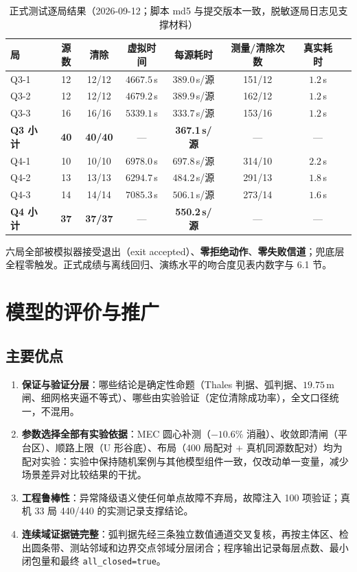 \documentclass[12pt,a4paper]{ctexart}
\begin{document}
\begin{table}[H]
  \centering
  \caption{正式测试逐局结果（2026-09-12；脚本 md5 与提交版本一致，脱敏逐局日志见支撑材料）}
  \label{tab:formal}
  \begin{tabular}{lccccccc}
    \toprule
    局 & 源数 & 清除 & 虚拟时间 & 每源耗时 & 测量/清除次数 & 真实耗时 \\
    \midrule
    Q3-1 & 12 & 12/12 & $4667.5\,$s & $389.0\,$s/源 & 151/12 & $1.2\,$s \\
    Q3-2 & 12 & 12/12 & $4679.2\,$s & $389.9\,$s/源 & 162/12 & $1.2\,$s \\
    Q3-3 & 16 & 16/16 & $5339.1\,$s & $333.7\,$s/源 & 153/16 & $1.2\,$s \\
    \midrule
    \textbf{Q3 小计} & \textbf{40} & \textbf{40/40} & --- & \textbf{367.1\,s/源} & --- & --- \\
    \midrule
    Q4-1 & 10 & 10/10 & $6978.0\,$s & $697.8\,$s/源 & 314/10 & $2.2\,$s \\
    Q4-2 & 13 & 13/13 & $6294.7\,$s & $484.2\,$s/源 & 291/13 & $1.8\,$s \\
    Q4-3 & 14 & 14/14 & $7085.3\,$s & $506.1\,$s/源 & 273/14 & $1.6\,$s \\
    \midrule
    \textbf{Q4 小计} & \textbf{37} & \textbf{37/37} & --- & \textbf{550.2\,s/源} & --- & --- \\
    \bottomrule
  \end{tabular}
\end{table}

六局全部被模拟器接受退出（exit accepted）、\textbf{零拒绝动作}、\textbf{零失败信道}；兜底层全程零触发。正式成绩与离线回归、演练水平的吻合度见表内数字与 6.1 节。

\section{模型的评价与推广}

\subsection{主要优点}

\begin{enumerate}[leftmargin=2em,itemsep=3pt]
  \item \textbf{保证与验证分层}：哪些结论是确定性命题（Thales 判据、弧判据、$19.75\,$m 闸、细网格夹逼不等式）、哪些由实验验证（定位清除成功率），全文口径统一，不混用。
  \item \textbf{参数选择全部有实验依据}：MEC 圆心补测（$-10.6\%$ 消融）、收敛即清闸（平台区）、顺路上限（U 形谷底）、布局（400 局配对 $+$ 真机同源数配对）均为配对实验：实验中保持随机案例与其他模型组件一致，仅改动单一变量，减少场景差异对比较结果的干扰。
  \item \textbf{工程鲁棒性}：异常降级语义使任何单点故障不弃局，故障注入 100 项验证；真机 33 局 440/440 的实测记录支撑结论。
  \item \textbf{连续域证据链完整}：弧判据先经三条独立数值通道交叉复核，再按主体区、检出圆条带、测站邻域和边界交点邻域分层闭合；程序输出记录每层点数、最小闭包量和最终 \verb|all_closed=true|。
\end{enumerate}
\end{document}
